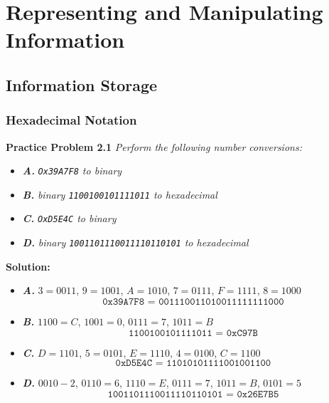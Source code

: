 \documentclass[a4paper]{report}
\begin{document}
\setcounter{chapter}{1}
\chapter{Representing and Manipulating Information}
	\section{Information Storage}
	\subsection{Hexadecimal Notation}
	\textbf{Practice Problem 2.1} \textit{Perform the following number conversions:}
	\begin{itemize}
		\item \textbf{\textit{A.}}  \textit{\texttt{Ox39A7F8} to binary}
		\item \textbf{\textit{B.}}  \textit{binary \texttt{1100100101111011} to hexadecimal}
		\item \textbf{\textit{C.}}  \textit{\texttt{OxD5E4C} to binary}
		\item \textbf{\textit{D.}}  \textit{binary \texttt{1001101110011110110101} to hexadecimal}
	\end{itemize}
	\textbf{Solution:}
	\begin{itemize}
		\item \textbf{\textit{A. }} \(3 = 0011\), \(9 = 1001\), \(A = 1010\), \(7 = 0111\), \(F = 1111\), \(8 = 1000\)
		\[\texttt{0x39A7F8 = 001110011010011111111000} \]
		\item \textbf{\textit{B. }} \(1100 = C\), \(1001 = 0\), \(0111 = 7\), \(1011 = B\)
		\[\texttt{1100100101111011 = 0xC97B} \]
		\item \textbf{\textit{C. }} \(D = 1101\), \(5 = 0101\), \(E = 1110\), \(4 = 0100\), \(C = 1100\)
		\[\texttt{0xD5E4C = 11010101111001001100} \]
		\item \textbf{\textit{D. }} \(0010 - 2\), \(0110 = 6\), \(1110 = E\), \(0111 = 7\), \(1011 = B\), \(0101 = 5\)
		\[\texttt{1001101110011110110101 = 0x26E7B5} \]
		
	\end{itemize}	 
\end{document}
